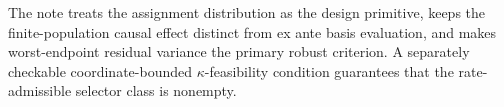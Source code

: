 The note treats the assignment distribution as the design primitive, keeps the finite-population causal effect distinct from ex ante basis evaluation, and makes worst-endpoint residual variance the primary robust criterion.  A separately checkable coordinate-bounded \(\kappa\)-feasibility condition guarantees that the rate-admissible selector class is nonempty.
